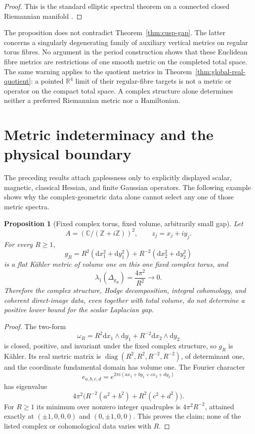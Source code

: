 \documentclass[11pt]{article}
\numberwithin{equation}{section}
\newtheorem{proposition}[theorem]{Proposition}
\theoremstyle{definition}
\theoremstyle{remark}
\newcommand{\R}{\mathbb R}
\newcommand{\C}{\mathbb C}
\newcommand{\Z}{\mathbb Z}
\newcommand{\dd}{\mathrm d}
\begin{document}
\begin{proof}
This is the standard elliptic spectral theorem on a connected closed Riemannian manifold \citep{Chavel_1984}.
\end{proof}

The proposition does not contradict Theorem~\ref{thm:cusp-gap}.  The latter concerns a singularly degenerating family of auxiliary vertical metrics on regular torus fibres.  No argument in the period construction shows that these Euclidean fibre metrics are restrictions of one smooth metric on the completed total space.  The same warning applies to the quotient metrics in Theorem~\ref{thm:global-real-quotient}: a pointed $\R^4$ limit of their regular-fibre targets is not a metric or operator on the compact total space.  A complex structure alone determines neither a preferred Riemannian metric nor a Hamiltonian.

\section{Metric indeterminacy and the physical boundary}

The preceding results attach gaplessness only to explicitly displayed scalar,
magnetic, classical Hessian, and finite Gaussian operators.  The following
example shows why the complex-geometric data alone cannot select any one of
those metric spectra.

\begin{proposition}[Fixed complex torus, fixed volume, arbitrarily small gap]
\label{prop:fixed-complex-metric-counterexample}
Let
\[
 A=(\C/(\Z+i\Z))^2,
 \qquad z_j=x_j+iy_j.
\]
For every $R\ge1$,
\begin{equation}\label{eq:fixed-complex-metric}
 g_R=R^2(\dd x_1^2+\dd y_1^2)
     +R^{-2}(\dd x_2^2+\dd y_2^2)
\end{equation}
is a flat Kähler metric of volume one on this one fixed complex torus, and
\begin{equation}\label{eq:fixed-complex-small-gap}
 \lambda_1(\Delta_{g_R})=\frac{4\pi^2}{R^2}\longrightarrow0.
\end{equation}
Therefore the complex structure, Hodge decomposition, integral cohomology,
and coherent direct-image data, even together with total volume, do not
determine a positive lower bound for the scalar Laplacian gap.
\end{proposition}

\begin{proof}
The two-form
\[
 \omega_R=R^2\dd x_1\wedge\dd y_1
          +R^{-2}\dd x_2\wedge\dd y_2
\]
is closed, positive, and invariant under the fixed complex structure, so
$g_R$ is Kähler.  Its real metric matrix is
$\operatorname{diag}(R^2,R^2,R^{-2},R^{-2})$, of determinant one, and the
coordinate fundamental domain has volume one.  The Fourier character
\[
 e_{a,b,c,d}=e^{2\pi i(ax_1+by_1+cx_2+dy_2)}
\]
has eigenvalue
\[
 4\pi^2\bigl(R^{-2}(a^2+b^2)+R^2(c^2+d^2)\bigr).
\]
For $R\ge1$ its minimum over nonzero integer quadruples is
$4\pi^2R^{-2}$, attained exactly at
$(\pm1,0,0,0)$ and $(0,\pm1,0,0)$.  This proves the claim; none of the
listed complex or cohomological data varies with $R$.
\end{proof}
\end{document}
